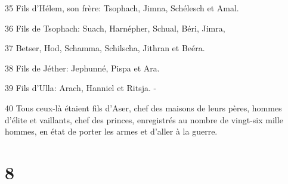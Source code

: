 \par 35 Fils d'Hélem, son frère: Tsophach, Jimna, Schélesch et Amal.
\par 36 Fils de Tsophach: Suach, Harnépher, Schual, Béri, Jimra,
\par 37 Betser, Hod, Schamma, Schilscha, Jithran et Beéra.
\par 38 Fils de Jéther: Jephunné, Pispa et Ara.
\par 39 Fils d'Ulla: Arach, Hanniel et Ritsja. -
\par 40 Tous ceux-là étaient fils d'Aser, chef des maisons de leurs pères, hommes d'élite et vaillants, chef des princes, enregistrés au nombre de vingt-six mille hommes, en état de porter les armes et d'aller à la guerre.

\chapter{8}

